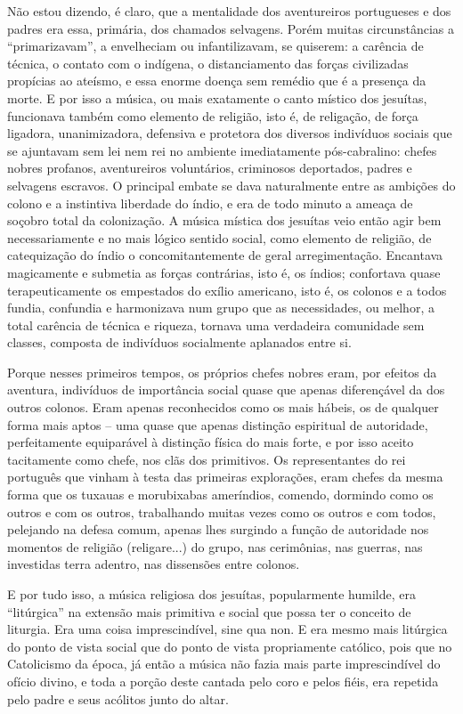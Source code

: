 Não estou dizendo, é claro, que a mentalidade dos aventureiros
portugueses e dos padres era essa, primária, dos chamados selvagens.
Porém muitas circunstâncias a ``primarizavam'', a envelheciam ou
infantilizavam, se quiserem: a carência de técnica, o contato com o
indígena, o distanciamento das forças civilizadas propícias ao ateísmo,
e essa enorme doença sem remédio que é a presença da morte. E por isso a
música, ou mais exatamente o canto místico dos jesuítas, funcionava
também como elemento de religião, isto é, de religação, de força
ligadora, unanimizadora, defensiva e protetora dos diversos indivíduos
sociais que se ajuntavam sem lei nem rei no ambiente imediatamente
pós-cabralino: chefes nobres profanos, aventureiros voluntários,
criminosos deportados, padres e selvagens escravos. O principal embate
se dava naturalmente entre as ambições do colono e a instintiva
liberdade do índio, e era de todo minuto a ameaça de soçobro total da
colonização. A música mística dos jesuítas veio então agir bem
necessariamente e no mais lógico sentido social, como elemento de
religião, de catequização do índio o concomitantemente de geral
arregimentação. Encantava magicamente e submetia as forças contrárias,
isto é, os índios; confortava quase terapeuticamente os empestados do
exílio americano, isto é, os colonos e a todos fundia, confundia e
harmonizava num grupo que as necessidades, ou melhor, a total carência
de técnica e riqueza, tornava uma verdadeira comunidade sem classes,
composta de indivíduos socialmente aplanados entre si.

Porque nesses primeiros tempos, os próprios chefes nobres eram, por
efeitos da aventura, indivíduos de importância social quase que apenas
diferençável da dos outros colonos. Eram apenas reconhecidos como os
mais hábeis, os de qualquer forma mais aptos -- uma quase que apenas
distinção espiritual de autoridade, perfeitamente equiparável à
distinção física do mais forte, e por isso aceito tacitamente como
chefe, nos clãs dos primitivos. Os representantes do rei português que
vinham à testa das primeiras explorações, eram chefes da mesma forma que
os tuxauas e morubixabas ameríndios, comendo, dormindo como os outros e
com os outros, trabalhando muitas vezes como os outros e com todos,
pelejando na defesa comum, apenas lhes surgindo a função de autoridade
nos momentos de religião (religare...) do grupo, nas cerimônias, nas
guerras, nas investidas terra adentro, nas dissensões entre colonos.

E por tudo isso, a música religiosa dos jesuítas, popularmente humilde,
era ``litúrgica'' na extensão mais primitiva e social que possa ter o
conceito de liturgia. Era uma coisa imprescindível, sine qua non. E era
mesmo mais litúrgica do ponto de vista social que do ponto de vista
propriamente católico, pois que no Catolicismo da época, já então a
música não fazia mais parte imprescindível do ofício divino, e toda a
porção deste cantada pelo coro e pelos fiéis, era repetida pelo padre e
seus acólitos junto do altar.

